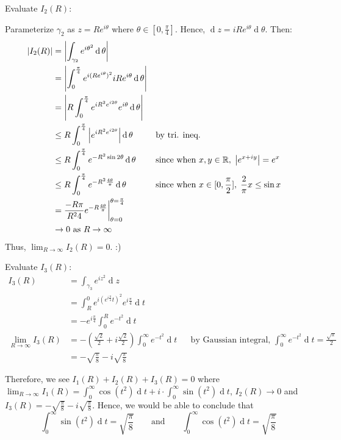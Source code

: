 \documentclass[12pt]{article}
\renewcommand{\d}{\ensuremath{\operatorname{d}}}
\begin{document}
Evaluate $I_2(R)$:

Parameterize $\gamma_2$ as $z=Re^{i\theta}$ where $\theta\in[0,\frac{\pi}{4}]$. Hence, $\d z = iRe^{i\theta}\d \theta$. Then:
\begin{align*}
    |I_2(R)| &= \left|\int_{\gamma_2} e^{i\theta^2}\d \theta\right|\\
    &= \left|\int_{0}^{\frac{\pi}{4}}e^{i(R e^{i\theta})^2}iRe^{i\theta}\d \theta\right|\\
    &= \left|R\int_{0}^{\frac{\pi}{4}}e^{iR^2e^{i2\theta}}e^{i\theta}\d \theta\right|\\
    &\leq R\int_{0}^{\frac{\pi}{4}}\left|e^{iR^2e^{i2\theta}}\right|\d \theta &&\text{by tri. ineq.}\\
    &\leq R\int_{0}^{\frac{\pi}{4}}e^{-R^2\sin2\theta}\d \theta&&\text{since when }x,y\in \R,\; \left|e^{x+iy}\right|=e^{x}\\
    &\leq  R\int_{0}^{\frac{\pi}{4}} e^{-R^2\frac{4\theta}{\pi}}\d \theta &&\text{since when }x\in [0,\frac{\pi}{2}],\; \frac{2}{\pi}x\leq \sin x\\
    &= \frac{-R\pi}{R^2 4}e^{-R\frac{4\theta}{\pi}}\bigg |_{\theta=0}^{\theta=\frac{\pi}{4}}\\
    &\to 0 \text{ as }R\to \infty
\end{align*}
Thus, $\lim_{R\to \infty}I_2(R)=0$. :)

Evaluate $I_3(R)$:
\begin{align*}
    I_3(R) &=\int_{\gamma_3} e^{iz^2}\d z\\
    &= \int_{R}^{0}e^{i(e^{i\frac{\pi}{4}}t)^2}e^{i\frac{\pi}{4}}\d t\\
    &= -e^{i\frac{\pi}{4}} \int_{0}^{R}e^{-t^2}\d t\\
    \lim_{R\to \infty} I_3(R) &= -(\frac{\sqrt{2}}{2}+i\frac{\sqrt{2}}{2})\int_{0}^{\infty}e^{-t^2}\d t &&\text{by Gaussian integral, }\int_{0}^{\infty}e^{-t^2}\d t = \frac{\sqrt{\pi}}{2}\\
    &= -\sqrt{\frac{\pi}{8}}-i\sqrt{\frac{\pi}{8}}
\end{align*}

Therefore, we see $I_1(R)+I_2(R)+I_3(R)=0$ where $\lim_{R\to \infty}I_1(R)= \int_{0}^{\infty}\cos (t^2)\d t + i\cdot \int_{0}^{\infty}\sin (t^2)\d t$, $I_2(R)\to 0$ and $I_3(R)= -\sqrt{\frac{\pi}{8}}-i\sqrt{\frac{\pi}{8}}$. Hence, we would be able to conclude that \[\int_{0}^{\infty}\sin (t^2)\d t = \sqrt{\frac{\pi}{8}} \qquad \text{and} \qquad \int_{0}^{\infty}\cos (t^2)\d t = \sqrt{\frac{\pi}{8}}\]
\end{document}

